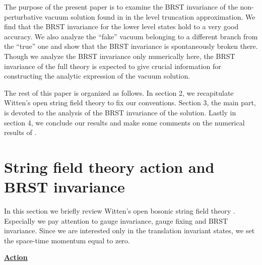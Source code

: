 \documentclass[a4paper,12pt]{article}
\begin{document}
The purpose of the present paper is to examine the BRST invariance of
the non-perturbative vacuum solution found in \cite{SZ,Moeller:2000xv}
in the level truncation approximation.
We find that the BRST invariance for the lower level states hold to a
very good accuracy.
We also analyze the ``fake'' vacuum belonging to a different branch
from the ``true'' one and show that the BRST invariance is
spontaneously broken there.
Though we analyze the BRST invariance only numerically here,
the BRST invariance of the full theory is expected to give
crucial information for constructing the analytic expression of the
vacuum solution.

The rest of this paper is organized as follows.
In section 2, we recapitulate Witten's open string field theory
to fix our conventions.
Section 3, the main part, is devoted to the analysis of the BRST
invariance of the solution.
Lastly in section 4, we conclude our results and make some comments on
the numerical results of \cite{SZ,Moeller:2000xv}.

\section{String field theory action and BRST invariance}
\label{sec:gauge-fix}

In this section we briefly review Witten's open bosonic string field
theory \cite{Witten:1986cc}.
Especially we pay attention to gauge invariance, gauge fixing and
BRST invariance.
Since we are interested only in the translation invariant states, we
set the space-time momentum equal to zero.

\noindent\underline{\bf Action}
\end{document}
